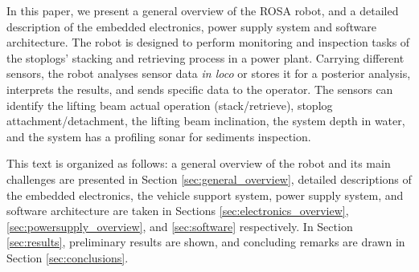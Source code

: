 In this paper, we present a general overview of the ROSA robot, and a detailed
description of the embedded electronics, power supply system and software
architecture. The robot is designed to perform monitoring and inspection
tasks of the stoplogs' stacking and retrieving process in a power
plant. Carrying different sensors, the robot analyses sensor data \emph{in
loco} or stores it for a posterior analysis, interprets the results, and
sends specific data to the operator. The sensors can identify the lifting beam
actual operation (stack/retrieve), stoplog attachment/detachment, the
lifting beam inclination, the system depth in water, and the system has a
profiling sonar for sediments inspection. 

This text is organized as follows: a general overview of the robot and its main
challenges are presented in Section \ref{sec:general_overview}, detailed
descriptions of the embedded electronics, the vehicle support system, power
supply system, and software architecture are taken in
Sections \ref{sec:electronics_overview}, \ref{sec:powersupply_overview}, and
\ref{sec:software} respectively.
In Section \ref{sec:results}, preliminary results are shown, and concluding
remarks are drawn in Section \ref{sec:conclusions}.